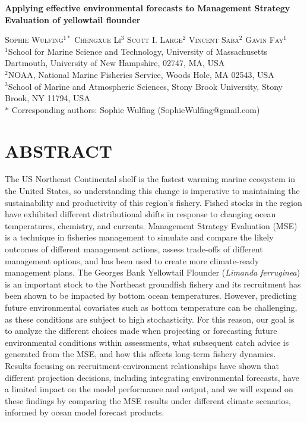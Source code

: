\documentclass[
  12pt,
]{article}
\author{}
\date{\vspace{-2.5em}}
\begin{document}
\doublespacing

\begin{center}
    
\textbf{\Large Applying effective environmental forecasts to Management Strategy Evaluation of yellowtail flounder}
    
\textsc{Sophie Wulfing$^{1*}$ Chengxue Li$^{3}$ Scott I. Large$^{2}$ Vincent Saba$^{2}$ Gavin Fay$^{1}$\\}
\vspace{3 mm}
\normalsize{\indent $^1$School for Marine Science and Technology, University of Massachusetts Dartmouth, University of New Hampshire, 02747, MA, USA\\ $^2$NOAA, National Marine Fisheries Service, Woods Hole, MA 02543, USA\\ $^3$School of Marine and Atmospheric Sciences, Stony Brook University, Stony Brook, NY 11794, USA\\}
$\text{*}$ Corresponding authors: Sophie Wulfing (SophieWulfing@gmail.com)
\end{center}

\newpage

\linenumbers

\section{ABSTRACT}\label{abstract}

The US Northeast Continental shelf is the fastest warming marine ecosystem in the United States, so understanding this change is imperative to maintaining the sustainability and productivity of this region's fishery. Fished stocks in the region have exhibited different distributional shifts in response to changing ocean temperatures, chemistry, and currents. Management Strategy Evaluation (MSE) is a technique in fisheries management to simulate and compare the likely outcomes of different management actions, assess trade-offs of different management options, and has been used to create more climate-ready management plans. The Georges Bank Yellowtail Flounder (\emph{Limanda ferruginea}) is an important stock to the Northeast groundfish fishery and its recruitment has been shown to be impacted by bottom ocean temperatures. However, predicting future environmental covariates such as bottom temperature can be challenging, as these conditions are subject to high stochasticity. For this reason, our goal is to analyze the different choices made when projecting or forecasting future environmental conditions within assessments, what subsequent catch advice is generated from the MSE, and how this affects long-term fishery dynamics. Results focusing on recruitment-environment relationships have shown that different projection decisions, including integrating environmental forecasts, have a limited impact on the model performance and output, and we will expand on these findings by comparing the MSE results under different climate scenarios, informed by ocean model forecast products.
\end{document}
